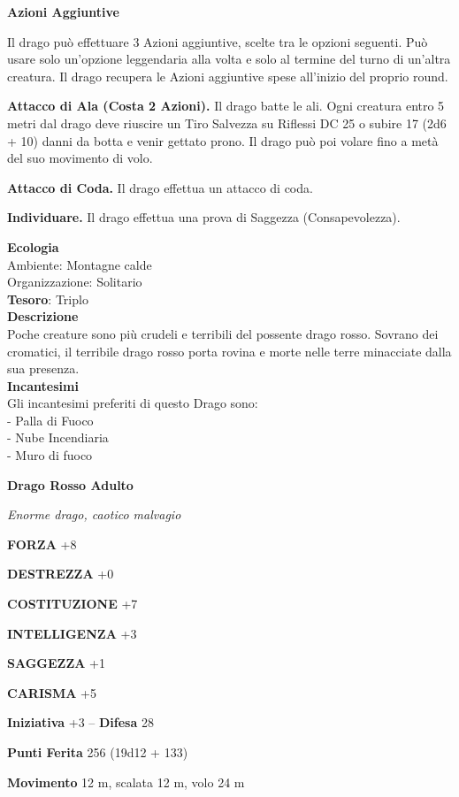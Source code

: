 \begin{multicols}{2}
\textbf{Azioni Aggiuntive}

Il drago può effettuare 3 Azioni aggiuntive, scelte tra le opzioni seguenti. Può usare solo un'opzione leggendaria alla volta e solo al termine del turno di un'altra creatura. Il drago recupera le Azioni aggiuntive spese all'inizio del proprio round.

\textbf{Attacco di Ala (Costa 2 Azioni).} Il drago batte le ali. Ogni creatura entro 5 metri dal drago deve riuscire un Tiro Salvezza su Riflessi DC 25 o subire 17 (2d6 + 10) danni da botta e venir gettato prono. Il drago può poi volare fino a metà del suo movimento di volo.

\textbf{Attacco di Coda.} Il drago effettua un attacco di coda.

\textbf{Individuare.} Il drago effettua una prova di Saggezza (Consapevolezza).

\textbf{Ecologia}\\
Ambiente: Montagne calde\\
Organizzazione: Solitario\\
\textbf{Tesoro}: Triplo\\
\textbf{Descrizione}\\
Poche creature sono più crudeli e terribili del possente drago rosso. Sovrano dei cromatici, il terribile drago rosso porta rovina e morte nelle terre minacciate dalla sua presenza.\\
\textbf{Incantesimi}\\
Gli incantesimi preferiti di questo Drago sono:\\
- Palla di Fuoco\\
- Nube Incendiaria\\
- Muro di fuoco


\medskip{}\textbf{Drago Rosso Adulto}

\textit{Enorme drago, caotico malvagio}

\textbf{FORZA} +8

\textbf{DESTREZZA} +0

\textbf{COSTITUZIONE} +7

\textbf{INTELLIGENZA} +3

\textbf{SAGGEZZA} +1

\textbf{CARISMA} +5

\textbf{Iniziativa} +3 -- \textbf{Difesa} 28

\textbf{Punti Ferita} 256 (19d12 + 133)

\textbf{Movimento} 12 m, scalata 12 m, volo 24 m


\end{multicols}
